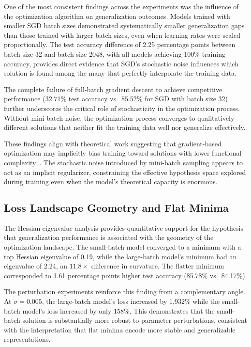 \documentclass[conference]{IEEEtran}
\begin{document}
One of the most consistent findings across the experiments was the influence of the optimization algorithm on generalization outcomes. Models trained with smaller SGD batch sizes demonstrated systematically smaller generalization gaps than those trained with larger batch sizes, even when learning rates were scaled proportionally. The test accuracy difference of 2.25 percentage points between batch size 32 and batch size 2048, with all models achieving 100\% training accuracy, provides direct evidence that SGD's stochastic noise influences which solution is found among the many that perfectly interpolate the training data.

The complete failure of full-batch gradient descent to achieve competitive performance (32.71\% test accuracy vs.\ 85.52\% for SGD with batch size 32) further underscores the critical role of stochasticity in the optimization process. Without mini-batch noise, the optimization process converges to qualitatively different solutions that neither fit the training data well nor generalize effectively.

These findings align with theoretical work suggesting that gradient-based optimization may implicitly bias training toward solutions with lower functional complexity~\cite{arora2019implicit}. The stochastic noise introduced by mini-batch sampling appears to act as an implicit regularizer, constraining the effective hypothesis space explored during training even when the model's theoretical capacity is enormous.

\subsection{Loss Landscape Geometry and Flat Minima}

The Hessian eigenvalue analysis provides quantitative support for the hypothesis that generalization performance is associated with the geometry of the optimization landscape. The small-batch model converged to a minimum with a top Hessian eigenvalue of 0.19, while the large-batch model's minimum had an eigenvalue of 2.24, an $11.8\times$ difference in curvature. The flatter minimum corresponded to 1.61 percentage points higher test accuracy (85.78\% vs.\ 84.17\%).

The perturbation experiments reinforce this finding from a complementary angle. At $\sigma = 0.005$, the large-batch model's loss increased by 1,932\% while the small-batch model's loss increased by only 158\%. This demonstrates that the small-batch solution is substantially more robust to parameter perturbations, consistent with the interpretation that flat minima encode more stable and generalizable representations.
\end{document}
